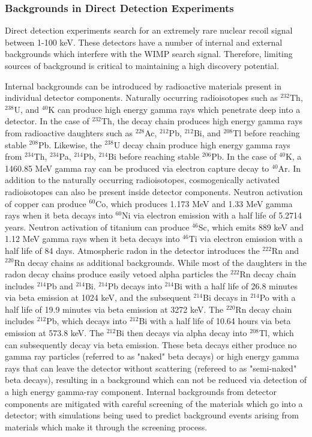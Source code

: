 \documentclass[a4paper,12pt]{article}
\begin{document}
\subsubsection{Backgrounds in Direct Detection Experiments} \label{Backgrounds}

Direct detection experiments search for an extremely rare nuclear recoil signal between 1-100 keV.  These detectors have a number of internal and external backgrounds which interfere with the WIMP search signal.  Therefore, limiting sources of background is critical to maintaining a high discovery potential.  

Internal backgrounds can be introduced by radioactive materials present in individual detector components.  Naturally occurring radioisotopes such as $^{232}$Th, $^{238}$U, and $^{40}$K can produce high energy gamma rays which penetrate deep into a detector.  In the case of $^{232}$Th, the decay chain produces high energy gamma rays from radioactive daughters such as $^{228}$Ac, $^{212}$Pb, $^{212}$Bi, and $^{208}$Tl before reaching stable $^{208}$Pb.  Likewise, the $^{238}$U decay chain produce high energy gamma rays from $^{234}$Th, $^{234}$Pa, $^{214}$Pb, $^{214}$Bi before reaching stable $^{206}$Pb.  In the case of $^{40}$K, a 1460.85 MeV gamma ray can be produced via electron capture decay to $^{40}$Ar.  In addition to the naturally occurring radioisotopes, cosmogenically activated radioisotopes can also be present inside detector components.  Neutron activation of copper can produce $^{60}$Co, which produces 1.173 MeV and 1.33 MeV gamma rays when it beta decays into $^{60}$Ni via electron emission with a half life of 5.2714 years.  Neutron activation of titanium can produce $^{46}$Sc, which emits 889 keV and 1.12 MeV gamma rays when it beta decays into $^{46}$Ti via electron emission with a half life of 84 days.  Atmospheric radon in the detector introduces the $^{222}$Rn and $^{220}$Rn decay chains as additional backgrounds. While most of the daughters in the radon decay chains produce easily vetoed alpha particles the $^{222}$Rn decay chain includes $^{214}$Pb and $^{214}$Bi.  $^{214}$Pb decays into $^{214}$Bi with a half life of 26.8 minutes via beta emission at 1024 keV, and the subsequent $^{214}$Bi decays in $^{214}$Po with a half life of 19.9 minutes via beta emission at 3272 keV.  The $^{220}$Rn decay chain includes $^{212}$Pb, which decays into $^{212}$Bi with a half life of 10.64 hours via beta emission at 573.8 keV.  The $^{212}$Bi then decays via alpha decay into $^{208}$Tl, which can subsequently decay via beta emission.  These beta decays either produce no gamma ray particles (referred to as "naked" beta decays) or high energy gamma rays that can leave the detector without scattering (refereed to as "semi-naked" beta decays), resulting in a background which can not be reduced via detection of a high energy gamma-ray component.  Internal backgrounds from detector components are mitigated with careful screening of the materials which go into a detector; with simulations being used to predict background events arising from materials which make it through the screening process. \cite{PauloThesis}
	 	
\end{document}
